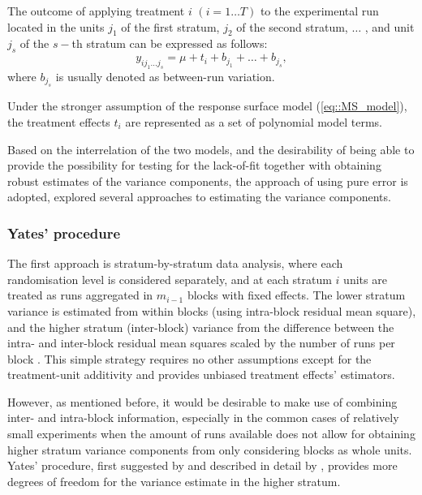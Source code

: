 The outcome of applying treatment $i$ $(i=1\ldots T)$ to the experimental run located in the units $j_1$ of the first stratum, $j_2$ of the second stratum, $\ldots$ , and unit $j_s$ of the $s-$th stratum can be expressed as follows:
\begin{equation}
\label{eq::ms_tr}
y_{ij_{1}...j_{s}}=\mu+t_{i}+b_{j_1}+\ldots +b_{j_s},
\end{equation}
where $b_{j_s}$ is usually denoted as between-run variation. 

Under the stronger assumption of the response surface model (\ref{eq::MS_model}), the treatment effects $t_{i}$ are represented as a set of polynomial model terms.  

Based on the interrelation of the two models, and the desirability of being able to provide the possibility for testing for the lack-of-fit together with obtaining robust estimates of the variance components, the approach of using pure error is adopted, \cite{GilmourGoos2016Robust} explored several approaches to estimating the variance components. 

\subsubsection{Yates' procedure}
\label{sec::ch7_varest}
The first approach is stratum-by-stratum data analysis, where each randomisation level is considered separately, and at each stratum $i$ units are treated as runs aggregated in $m_{i-1}$ blocks with fixed effects. The lower stratum variance is estimated from within blocks (using intra-block residual mean square), and the higher stratum (inter-block) variance from the difference between the intra- and inter-block residual mean squares scaled by the number of runs per block \citep{Hinkelmann2005Advanced}. This simple strategy requires no other assumptions except for the treatment-unit additivity and provides unbiased treatment effects' estimators.

However, as mentioned before, it would be desirable to make use of combining inter- and intra-block information, especially in the common cases of relatively small experiments when the amount of runs available does not allow for obtaining higher stratum variance components from only considering blocks as whole units. Yates' procedure, first suggested by \cite{yates1939recovery} and described in detail by \cite{Hinkelmann2005Advanced}, provides more degrees of freedom for the variance estimate in the higher stratum. 

